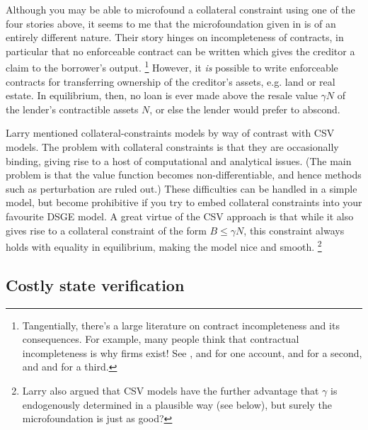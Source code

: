\documentclass[11pt,letterpaper,reqno,oneside]{article}
\begin{document}
Although you may be able to microfound a collateral constraint using one of the four stories above, it seems to me that the microfoundation given in \textcite{KiyotakiMoore1997} is of an entirely different nature. Their story hinges on incompleteness of contracts, in particular that no enforceable contract can be written which gives the creditor a claim to the borrower's output.%
	\footnote{Tangentially, there's a large literature on contract incompleteness and its consequences. For example, many people think that contractual incompleteness is why firms exist! See \textcite{Coase1937}, \textcite{KleinCrawfordAlchian1978} and \textcite{Williamson1975,Williamson1979,Williamson1985} for one account, \textcite{GrossmanHart1986} and \textcite{HartMoore1990} for a second, and \textcite{HolmstromMilgrom1991} and \textcite{HolmstromMilgrom1994} for a third.}
However, it \emph{is} possible to write enforceable contracts for transferring ownership of the creditor's assets, e.g. land or real estate. In equilibrium, then, no loan is ever made above the resale value $\gamma N$ of the lender's contractible assets $N$, or else the lender would prefer to abscond.

Larry mentioned collateral-constraints models by way of contrast with CSV models. The problem with collateral constraints is that they are occasionally binding, giving rise to a host of computational and analytical issues. (The main problem is that the value function becomes non-differentiable, and hence methods such as perturbation are ruled out.) These difficulties can be handled in a simple model, but become prohibitive if you try to embed collateral constraints into your favourite DSGE model. A great virtue of the CSV approach is that while it also gives rise to a collateral constraint of the form $B \leq \gamma N$, this constraint always holds with equality in equilibrium, making the model nice and smooth.%
	\footnote{Larry also argued that CSV models have the further advantage that $\gamma$ is endogenously determined in a plausible way (see below), but surely the \textcite{KiyotakiMoore1997} microfoundation is just as good?}



\subsection{Costly state verification}
\label{sec:30Nov2015:CSV}
\end{document}
